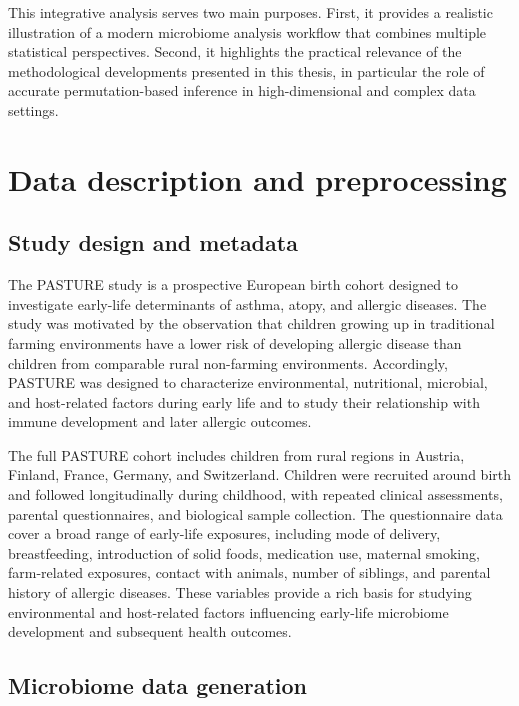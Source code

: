 This integrative analysis serves two main purposes. First, it provides a realistic illustration of a modern microbiome analysis workflow that combines multiple statistical perspectives. Second, it highlights the practical relevance of the methodological developments presented in this thesis, in particular the role of accurate permutation-based inference in high-dimensional and complex data settings.

\section{Data description and preprocessing}
\label{sec:7app:data}

\subsection{Study design and metadata}

The PASTURE study \citep{vonmutius2006pasture} is a prospective European birth cohort designed to investigate early-life determinants of asthma, atopy, and allergic diseases. The study was motivated by the observation that children growing up in traditional farming environments have a lower risk of developing allergic disease than children from comparable rural non-farming environments. Accordingly, PASTURE was designed to characterize environmental, nutritional, microbial, and host-related factors during early life and to study their relationship with immune development and later allergic outcomes.

The full PASTURE cohort includes children from rural regions in Austria, Finland, France, Germany, and Switzerland. Children were recruited around birth and followed longitudinally during childhood, with repeated clinical assessments, parental questionnaires, and biological sample collection. The questionnaire data cover a broad range of early-life exposures, including mode of delivery, breastfeeding, introduction of solid foods, medication use, maternal smoking, farm-related exposures, contact with animals, number of siblings, and parental history of allergic diseases. These variables provide a rich basis for studying environmental and host-related factors influencing early-life microbiome development and subsequent health outcomes.

\subsection{Microbiome data generation}

